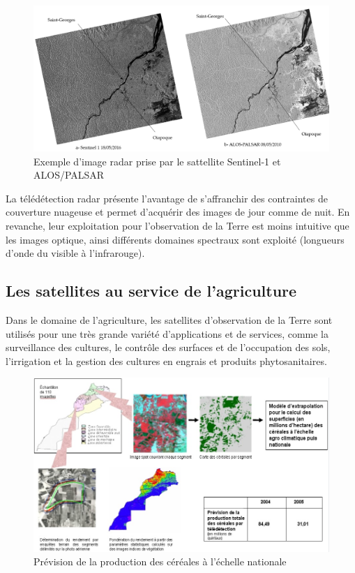 \documentclass[12pt, openany]{report}
\begin{document}
\begin{figure}[H]
\centering
\includegraphics[scale=0.3]{image_radar.png}
\caption{Exemple d'image radar prise par le sattellite Sentinel-1 et ALOS/PALSAR}
\end{figure}

\par
La télédétection radar présente l’avantage de s’affranchir des contraintes de couverture nuageuse et permet d'acquérir des images de jour comme de nuit. En revanche, leur exploitation pour l’observation de la Terre est moins intuitive que les images optique, ainsi différents domaines spectraux sont exploité (longueurs d’onde du visible à l’infrarouge).\cite{ref4}



\subsection{Les satellites au service de l'agriculture}

Dans le domaine de l'agriculture, les satellites d'observation de la Terre sont utilisés pour une très grande variété d’applications et de services, comme la surveillance des cultures, le contrôle des surfaces et de l'occupation des sols, l'irrigation et la gestion des cultures en engrais et produits phytosanitaires.  \cite{satt}


\begin{figure}[H]
\centering
\includegraphics[scale=0.7]{prev.jpg}
\caption{Prévision de la production des céréales à l'échelle nationale}
\end{figure}
\end{document}
